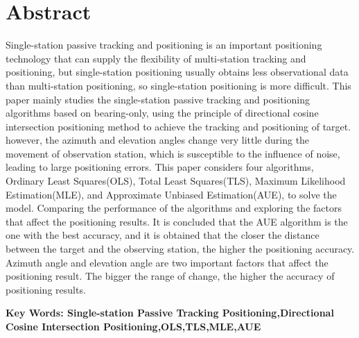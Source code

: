 \vspace*{2mm}

\begin{spacing}{0.95}
  \centering
  \heiti{}\textbf{\thesisTitleEN}
\end{spacing}

\vspace*{17mm}

{\let\clearpage\relax \chapter*{
  \textmd{Abstract}\vskip -3bp}}
\setcounter{page}{2}

\setlength{\parskip}{0em}

Single-station passive tracking and positioning is an important positioning technology that can supply the flexibility of multi-station tracking and positioning, but single-station positioning usually obtains less observational data than multi-station positioning, so single-station positioning is more difficult. This paper mainly studies the single-station passive tracking and positioning algorithms based on bearing-only, using the principle of directional cosine intersection positioning method to achieve the tracking and positioning of target. however, the azimuth and elevation angles change very little during the movement of observation station, which is susceptible to the influence of noise, leading to large positioning errors. This paper considers four algorithms, Ordinary Least Squares(OLS), Total Least Squares(TLS), Maximum Likelihood Estimation(MLE), and Approximate Unbiased Estimation(AUE), to solve the model. Comparing the performance of the algorithms and exploring the factors that affect the positioning results. It is concluded that the AUE algorithm is the one with the best accuracy, and it is obtained that the closer the distance between the target and the observing station, the higher the positioning accuracy.  Azimuth angle and elevation angle are two important factors that affect the positioning result. The bigger the range of change, the higher the accuracy of positioning results.

\vspace{3ex}\noindent\textbf{Key Words: Single-station Passive Tracking Positioning,Directional Cosine Intersection Positioning,OLS,TLS,MLE,AUE}
\newpage
